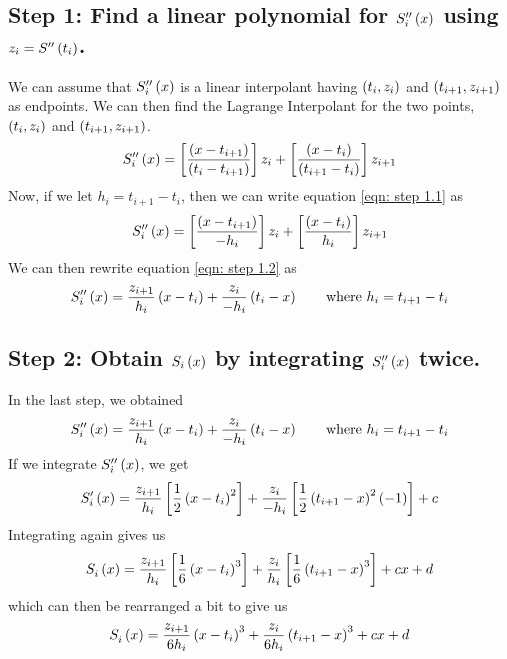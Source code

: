 \documentclass[letterpaper, 10pt, titlepage]{article}
\newcommand{\pp}{\paren}
\newcommand{\bb}{\brackets}
\newcommand{\primed}[1]{^{
    \ifthenelse
    {
        \equal{#1}{0}
    }
    {
    }
    {
        \foreach \x in {1,...,#1}{\prime}}
    }
}
\newcommand{\fs}[3]{\functionof{S_{#1}\primed{#2}}{#3}}
\begin{document}
\subsection*{Step 1: Find a linear polynomial for $\fs{i}{2}{x}$ using
$z_i = \fs{}{2}{t_i}$.}
We can assume that $\fs{i}{2}{x}$ is a linear interpolant having $\pp{t_i,z_i}$
and $\pp{t_{i+1}, z_{i+1}}$ as endpoints. We can then find the Lagrange
Interpolant for the two points, $\pp{t_i,z_i}$ and $\pp{t_{i+1}, z_{i+1}}$.
\begin{equation}
    \fs{i}{2}{x} =
    \bb{\dfrac{\pp{x - t_{i+1}}}{\pp{t_i - t_{i+1}}}}z_i
    +
    \bb{\dfrac{\pp{x - t_{i}}}{\pp{t_{i+1} - t_i }}}z_{i+1}
    \label{eqn: step 1.1}
\end{equation}
Now, if we let $h_i = t_{i+1} - t_i$, then we can write equation
\eqref{eqn: step 1.1} as
\begin{equation}
    \fs{i}{2}{x} =
    \bb{\dfrac{\pp{x - t_{i+1}}}{-h_i}}z_i
    +
    \bb{\dfrac{\pp{x - t_{i}}}{h_i}}z_{i+1}
    \label{eqn: step 1.2}
\end{equation}
We can then rewrite equation \eqref{eqn: step 1.2} as
\begin{equation}
    \fs{i}{2}{x} =
    \dfrac{z_{i+1}}{h_i}\pp{x - t_i}
    + \dfrac{z_{i}}{-h_i}\pp{t_i - x}
    \quad\quad
    \text{where } h_i = t_{i+1} - t_i
\end{equation}

\subsection*{Step 2: Obtain $S_i\left(x\right)$ by integrating
$\functionof{S_i\primed{2}}{x}$ twice.}
In the last step, we obtained
\begin{equation}
    \fs{i}{2}{x} =
    \dfrac{z_{i+1}}{h_i}\pp{x - t_i}
    + \dfrac{z_{i}}{-h_i}\pp{t_i - x}
    \quad\quad
    \text{where } h_i = t_{i+1} - t_i
\end{equation}
If we integrate $\fs{i}{2}{x}$, we get
\begin{equation}
    \fs{i}{1}{x} =
    \dfrac{z_{i+1}}{h_i}\bb{\frac{1}{2}\pp{x - t_i}^2}
    + \dfrac{z_{i}}{-h_i}\bb{\frac{1}{2}\pp{t_{i+1} - x}^2\pp{-1}} + c
\end{equation}
Integrating again gives us
\begin{equation}
    \fs{i}{0}{x} =
    \dfrac{z_{i+1}}{h_i}\bb{\frac{1}{6}\pp{x - t_i}^3}
    + \dfrac{z_{i}}{h_i}\bb{\frac{1}{6}\pp{t_{i+1} - x}^3} + cx + d
\end{equation}
which can then be rearranged a bit to give us
\begin{equation}
    \fs{i}{0}{x} =
    \dfrac{z_{i+1}}{6h_i}\pp{x - t_i}^3
    + \dfrac{z_{i}}{6h_i}\pp{t_{i+1} - x}^3 + cx + d
    \label{eqn: step 2.1}
\end{equation}
\end{document}
